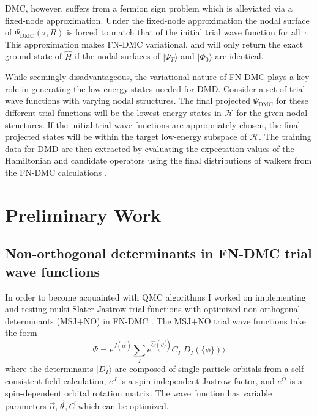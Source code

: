 \documentclass[12pt]{article}
\begin{document}
DMC, however, suffers from a fermion sign problem which is alleviated via a fixed-node approximation.
Under the fixed-node approximation the nodal surface of $\Psi_\text{DMC}(\tau, R)$ is forced to match that of the initial trial wave function for all $\tau$.
This approximation makes FN-DMC variational, and will only return the exact ground state of $\hat{H}$ if the nodal surfaces of $|\Psi_T\rangle$ and $|\Phi_0\rangle$ are identical.

While seemingly disadvantageous, the variational nature of FN-DMC plays
a key role in generating the low-energy states needed for DMD.
Consider a set of trial wave functions with varying nodal structures.
The final projected $\Psi_\text{DMC}$ for these different trial functions will be the lowest energy states in $\mathcal{H}$ for the given nodal structures.
If the initial trial wave functions are appropriately chosen, the final projected states will be within the target low-energy subspace of $\mathcal{H}$.
The training data for DMD are then extracted by evaluating the expectation values of the Hamiltonian and candidate operators using the final distributions of walkers from the FN-DMC calculations \cite{Wagner2015}.

\section{Preliminary Work}
\subsection{Non-orthogonal determinants in FN-DMC trial wave functions}
In order to become acquainted with QMC algorithms I worked on implementing and testing multi-Slater-Jastrow trial functions with optimized non-orthogonal determinants (MSJ+NO) in FN-DMC \cite{doi:10.1063/1.5052906}.
The MSJ+NO trial wave functions take the form
\begin{equation}
\Psi=e^{J(\vec{\alpha})} \sum_I e^{\hat{\Theta}(\vec{\theta_I})} C_I |D_I (\{ \phi\})\rangle
\end{equation}
where the determinants $|D_I\rangle$ are composed of single particle orbitals from a self-consistent field calculation, $e^J$ is a spin-independent Jastrow factor, and $e^{\hat{\Theta}}$ is a spin-dependent orbital rotation matrix.
The wave function has variable parameters $\vec{\alpha}, \vec{\theta}, \vec{C}$ which can be optimized.
\end{document}
